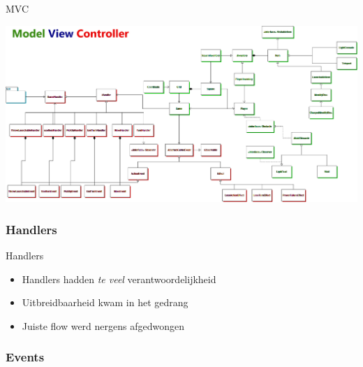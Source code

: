 \documentclass[t]{beamer}
\begin{document}
\begin{frame}{MVC}
\begin{center}
\includegraphics[width=1\linewidth]{images/overview}
\end{center}
\end{frame}

\subsubsection{Handlers}

\begin{frame}{Handlers}
\begin{center}
\end{center}
\begin{itemize}
	\item Handlers hadden \textit{te veel} verantwoordelijkheid
	\item Uitbreidbaarheid kwam in het gedrang
	\item Juiste flow werd nergens afgedwongen
\end{itemize}
\end{frame}

\subsubsection{Events}
\end{document}
